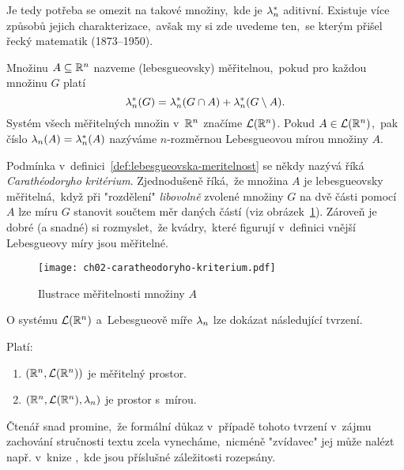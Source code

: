 Je tedy potřeba se omezit na takové množiny,~kde je $\lambda_n^*$ aditivní. Existuje více způsobů jejich charakterizace,~avšak my si zde uvedeme ten,~se kterým přišel řecký matematik  (1873--1950).
\begin{definition}\label{def:lebesgueovska-meritelnost}
    Množinu $A\subseteq\mathbb{R}^n$ nazveme (lebesgueovsky) měřitelnou,~pokud pro každou množinu $G$ platí
    \[\lambda_n^*(G)=\lambda_n^*(G\cap A)+\lambda_n^*(G\setminus A).\]
    Systém všech měřitelných množin v~$\mathbb{R}^n$ značíme $\mathcal{L}(\mathbb{R}^n)$.  Pokud $A\in\mathcal{L}(\mathbb{R}^n)$,~pak číslo $\lambda_n(A)=\lambda_n^*(A)$ nazýváme $n$-rozměrnou Lebesgueovou mírou množiny $A$.
\end{definition}
Podmínka v~definici~\ref{def:lebesgueovska-meritelnost} se někdy nazývá říká \emph{Carathéodoryho kritérium}. Zjednodušeně říká,~že množina $A$ je lebesgueovsky měřitelná,~když při "rozdělení" \emph{libovolně} zvolené množiny $G$ na dvě části pomocí $A$ lze míru $G$ stanovit součtem měr daných částí (viz obrázek~\ref{fig:caratheodoryho-kriterium}). Zároveň je dobré (a snadné) si rozmyslet,~že kvádry,~které figurují v~definici vnější Lebesgueovy míry jsou měřitelné.
\begin{figure}[h]
    \centering
    \texttt{[image: ch02-caratheodoryho-kriterium.pdf]}
    \caption{Ilustrace měřitelnosti množiny $A$}
    \label{fig:caratheodoryho-kriterium}
\end{figure}
O systému $\mathcal{L}(\mathbb{R}^n)$ a~Lebesgueově míře $\lambda_n$ lze dokázat následující tvrzení.
\begin{theorem}\label{thm:prostor-s-Lebesgueovou-mirou}
    Platí:
    \begin{enumerate}[label=(\roman*)]
        \item $(\mathbb{R}^n,\mathcal{L}(\mathbb{R}^n))$ je měřitelný prostor.
        \item $(\mathbb{R}^n,\mathcal{L}(\mathbb{R}^n),\lambda_n)$ je prostor s~mírou.
    \end{enumerate}
\end{theorem}
Čtenář snad promine,~že formální důkaz v~případě tohoto tvrzení v~zájmu zachování stručnosti textu zcela vynecháme,~nicméně "zvídavec" jej může nalézt např. v~knize \citep[str. 347]{Royden2010},~kde jsou příslušné záležitosti rozepsány.
